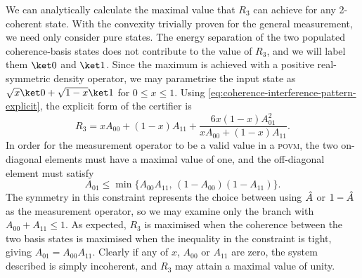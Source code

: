 We can analytically calculate the maximal value that $R_3$ can achieve for any 2-coherent state.
With the convexity trivially proven for the general measurement, we need only consider pure states.
The energy separation of the two populated coherence-basis states does not contribute to the value of $R_3$, and we will label them $\ket0$ and $\ket1$.
Since the maximum is achieved with a positive real-symmetric density operator, we may parametrise the input state as $\sqrt x\ket0 + \sqrt{1-x}\ket1$ for $0\le x\le1$.
Using \cref{eq:coherence-interference-pattern-explicit}, the explicit form of the certifier is
\begin{equation}
R_3 = xA_{00} + (1-x)A_{11} + \frac{6x(1-x)A_{01}^2}{xA_{00} + (1-x)A_{11}}.
\end{equation}
In order for the measurement operator to be a valid value in a \textsc{povm}, the two on-diagonal elements must have a maximal value of one, and the off-diagonal element must satisfy
\begin{equation}
A_{01} \le \min\bigl\{A_{00}A_{11},\,(1-A_{00})(1-A_{11})\bigr\}.
\end{equation}
The symmetry in this constraint represents the choice between using $\hat{A}$ or $1 - \hat{A}$ as the measurement operator, so we may examine only the branch with $A_{00} + A_{11} \le 1$.
As expected, $R_3$ is maximised when the coherence between the two basis states is maximised when the inequality in the constraint is tight, giving $A_{01} = A_{00}A_{11}$.
Clearly if any of $x$, $A_{00}$ or $A_{11}$ are zero, the system described is simply incoherent, and $R_3$ may attain a maximal value of unity.

